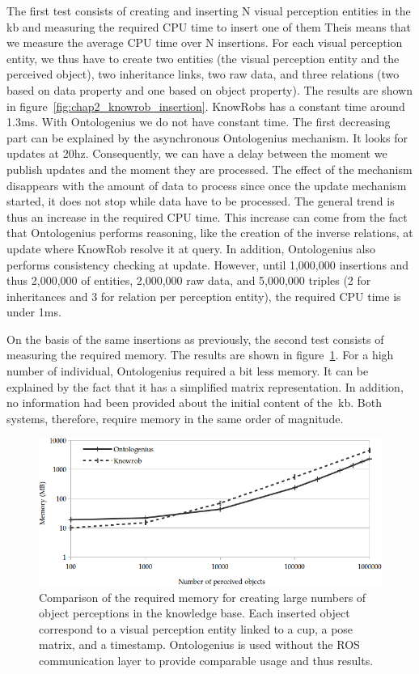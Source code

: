 The first test consists of creating and inserting N visual perception entities in the \acrshort{kb} and measuring the required CPU time to insert one of them Theis means that we measure the average CPU time over N insertions. For each visual perception entity, we thus have to create two entities (the visual perception entity and the perceived object), two inheritance links, two raw data, and three relations (two based on data property and one based on object property). The results are shown in figure~\ref{fig:chap2_knowrob_insertion}. KnowRobs has a constant time around 1.3ms. With Ontologenius we do not have constant time. The first decreasing part can be explained by the asynchronous Ontologenius mechanism. It looks for updates at 20hz. Consequently, we can have a delay between the moment we publish updates and the moment they are processed. The effect of the mechanism disappears with the amount of data to process since once the update mechanism started, it does not stop while data have to be processed. The general trend is thus an increase in the required CPU time. This increase can come from the fact that Ontologenius performs reasoning, like the creation of the inverse relations, at update where KnowRob resolve it at query. In addition, Ontologenius also performs consistency checking at update. However, until 1,000,000 insertions and thus 2,000,000 of entities, 2,000,000 raw data, and 5,000,000 triples (2 for inheritances and 3 for relation per perception entity), the required CPU time is under 1ms.

On the basis of the same insertions as previously, the second test consists of measuring the required memory. The results are shown in figure~\ref{fig:chap2_knowrob_memory}. For a high number of individual, Ontologenius required a bit less memory. It can be explained by the fact that it has a simplified matrix representation. In addition, no information had been provided about the initial content of the~\acrshort{kb}. Both systems, therefore, require memory in the same order of magnitude.

\begin{figure}[ht!]
\centering
\includegraphics[width=\textwidth]{figures/chapter2/knowrob/Memory.png}
\caption{\label{fig:chap2_knowrob_memory} Comparison of the required memory for creating large numbers of object perceptions in the knowledge base. Each inserted object correspond to a visual perception entity linked to a cup, a pose matrix, and a timestamp. Ontologenius is used without the ROS communication layer to provide comparable usage and thus results.}
\end{figure}

